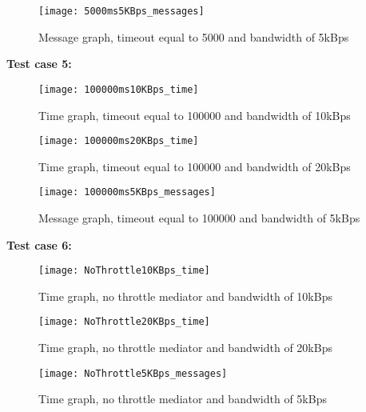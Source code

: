 	\begin{figure}[H]
		\centering
		\texttt{[image: 5000ms5KBps\_messages]}
		\caption{Message graph, timeout equal to 5000 and bandwidth of 5kBps} 
		\label{figure:results:5000ms5KBps_messages}
	\end{figure}
    
    \textbf{Test case 5:}\\
    
    \begin{figure}[H]
		\centering
		\texttt{[image: 100000ms10KBps\_time]}
		\caption{Time graph, timeout equal to 100000 and bandwidth of 10kBps} 
		\label{figure:results:100000ms10KBps_time}
	\end{figure}
	
	\begin{figure}[H]
		\centering
		\texttt{[image: 100000ms20KBps\_time]}
		\caption{Time graph, timeout equal to 100000 and bandwidth of 20kBps} 
		\label{figure:results:100000ms20KBps_time}
	\end{figure}
	
	\begin{figure}[H]
		\centering
		\texttt{[image: 100000ms5KBps\_messages]}
		\caption{Message graph, timeout equal to 100000 and bandwidth of 5kBps} 
		\label{figure:results:100000ms5KBps_messages}
	\end{figure}
    
    \textbf{Test case 6:}\\
    
    \begin{figure}[H]
		\centering
		\texttt{[image: NoThrottle10KBps\_time]}
		\caption{Time graph, no throttle mediator and bandwidth of 10kBps} 
		\label{figure:results:NoThrottle10KBps_time}
	\end{figure}
	
	\begin{figure}[H]
		\centering
		\texttt{[image: NoThrottle20KBps\_time]}
		\caption{Time graph, no throttle mediator and bandwidth of 20kBps} 
		\label{figure:results:NoThrottle20KBps_time}
	\end{figure}
	
	\begin{figure}[H]
		\centering
		\texttt{[image: NoThrottle5KBps\_messages]}
		\caption{Time graph, no throttle mediator and bandwidth of 5kBps} 
		\label{figure:results:NoThrottle5KBps_messages}
	\end{figure}
